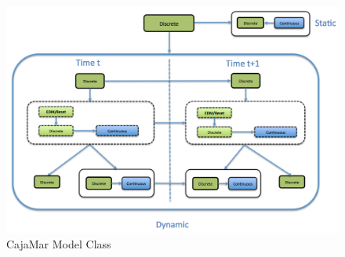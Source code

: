 \begin{figure}
\begin{center}
\caption{\label{Figure:AMIDSTModelClass} CajaMar Model Class}
\includegraphics[scale=0.7]{./figures/AMIDSTModelClass}
\end{center}
\end{figure}